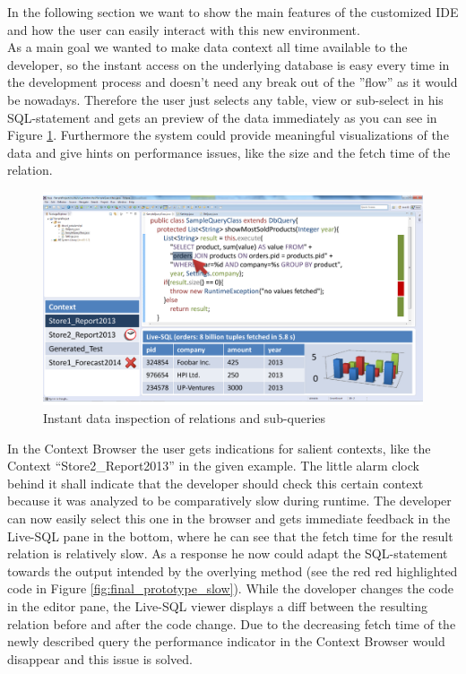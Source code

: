 In the following section we want to show the main features of the customized IDE and how the user can easily interact with this new environment.\\
As a main goal we wanted to make data context all time available to the developer, so the instant access on the underlying database is easy every time in the development process and doesn't need any break out of the ''flow'' as it would be nowadays. Therefore the user just selects any table, view or sub-select in his SQL-statement and gets an preview of the data immediately as you can see in Figure \ref{fig:final_prototype_instant}. Furthermore the system could provide meaningful visualizations of the data and give hints on performance issues, like the size and the fetch time of the relation.
\begin{figure}
\begin{centering}
    \includegraphics[width=1.0\linewidth]{images/instant}
    \caption{Instant data inspection of relations and sub-queries}
    \label{fig:final_prototype_instant}
\end{centering}
\end{figure}
In the Context Browser the user gets indications for salient contexts, like the Context ``Store2\_Report2013'' in the given example. The little alarm clock behind it shall indicate that the developer should check this certain context because it was analyzed to be comparatively slow during runtime. The developer can now easily select this one in the browser and gets immediate feedback in the Live-SQL pane in the bottom, where he can see that the fetch time for the result relation is relatively slow. As a response he now could adapt the SQL-statement towards the  output intended by the overlying method (see the red red highlighted code in Figure \ref{fig:final_prototype_slow}). While the doveloper changes the code in the editor pane, the Live-SQL viewer displays a diff between the resulting relation before and after the code change. Due to the decreasing fetch time of the newly described query the performance indicator in the Context Browser would disappear and this issue is solved.\\
